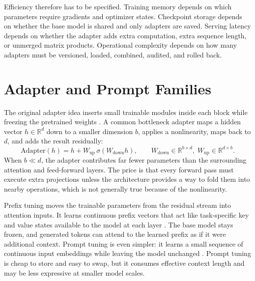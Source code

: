 Efficiency therefore has to be specified. Training memory depends on which parameters require gradients and optimizer states. Checkpoint storage depends on whether the base model is shared and only adapters are saved. Serving latency depends on whether the adapter adds extra computation, extra sequence length, or unmerged matrix products. Operational complexity depends on how many adapters must be versioned, loaded, combined, audited, and rolled back.

\section{Adapter and Prompt Families}
\label{sec:adapter-prompt-families}

The original adapter idea inserts small trainable modules inside each \transformer block while freezing the pretrained weights \cite{houlsby2019parameter}. A common bottleneck adapter maps a hidden vector $h\in\mathbb{R}^{d}$ down to a smaller dimension $b$, applies a nonlinearity, maps back to $d$, and adds the result residually:
\begin{equation}
  \mathrm{Adapter}(h) = h + W_{\mathrm{up}}\,
  \sigma(W_{\mathrm{down}} h),
  \qquad
  W_{\mathrm{down}}\in\mathbb{R}^{b\times d},\;
  W_{\mathrm{up}}\in\mathbb{R}^{d\times b}.
  \label{eq:adapter-block}
\end{equation}
When $b\ll d$, the adapter contributes far fewer parameters than the surrounding attention and feed-forward layers. The price is that every forward pass must execute extra projections unless the architecture provides a way to fold them into nearby operations, which is not generally true because of the nonlinearity.

Prefix tuning moves the trainable parameters from the residual stream into attention inputs. It learns continuous prefix vectors that act like task-specific key and value states available to the model at each layer \cite{li2021prefixtuning}. The base model stays frozen, and generated tokens can attend to the learned prefix as if it were additional context. Prompt tuning is even simpler: it learns a small sequence of continuous input embeddings while leaving the model unchanged \cite{lester2021power}. Prompt tuning is cheap to store and easy to swap, but it consumes effective context length and may be less expressive at smaller model scales.

